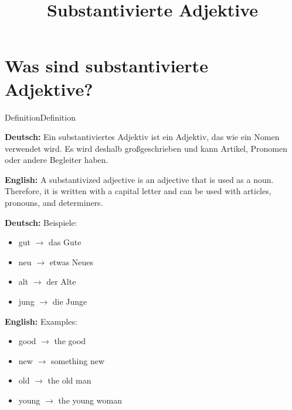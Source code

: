 \documentclass[a4paper,11pt]{article}
\title{Substantivierte Adjektive}
\date{}
\newcommand{\GermanText}[1]{\textbf{Deutsch: }#1\par}
\newcommand{\EnglishText}[1]{{\small\color{SoftGray}\textbf{English: }#1\par}}
\begin{document}
    
    \maketitle
    \tableofcontents
    \newpage
    
    
    \section{Was sind substantivierte Adjektive?}
        
        \begin{grammarentry}{Definition}{Definition}
            
            \GermanText{
                Ein substantiviertes Adjektiv ist ein Adjektiv, das wie ein Nomen verwendet wird.
                Es wird deshalb gro{\ss}geschrieben und kann Artikel, Pronomen oder andere Begleiter haben.
            }
            
            \EnglishText{
                A substantivized adjective is an adjective that is used as a noun.
                Therefore, it is written with a capital letter and can be used with articles, pronouns, and determiners.
            }
            
            \GermanText{
                Beispiele:
                \begin{itemize}
                    \item gut $\rightarrow$ das Gute
                    \item neu $\rightarrow$ etwas Neues
                    \item alt $\rightarrow$ der Alte
                    \item jung $\rightarrow$ die Junge
                \end{itemize}
            }
            
            \EnglishText{
                Examples:
                \begin{itemize}
                    \item good $\rightarrow$ the good
                    \item new $\rightarrow$ something new
                    \item old $\rightarrow$ the old man
                    \item young $\rightarrow$ the young woman
                \end{itemize}
            }
        
        \end{grammarentry}
    
\end{document}
